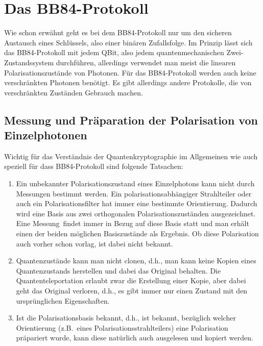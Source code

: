 \section{Das BB84-Protokoll}

Wie schon erw\"ahnt geht es bei dem BB84-Protokoll nur um den sicheren Austausch eines
Schl\"ussels, also einer bin\"aren Zufallsfolge. Im Prinzip l\"asst sich das BB84-Protokoll mit jedem
QBit, also jedem quantenmechanischen Zwei-Zustandssystem durchf\"uhren, allerdings verwendet
man meist die linearen Polarisationszust\"ande von Photonen. 
F\"ur das BB84-Protokoll werden auch keine verschr\"ankten
Photonen ben\"otigt. Es gibt allerdings andere Protokolle, die von verschr\"ankten Zust\"anden
Gebrauch machen. 

\subsection{Messung und Pr\"aparation der Polarisation von Einzelphotonen}

Wichtig f\"ur das Verst\"andnis der Quantenkryptographie im Allgemeinen wie auch speziell
f\"ur dass BB84-Protokoll sind folgende Tatsachen:
\begin{enumerate}
\item
Ein unbekannter Polarisationszustand eines Einzelphotons kann nicht durch Messungen bestimmt werden. 
Ein polarisationsabh\"angiger Strahlteiler oder auch ein Polarisationsfilter hat immer eine
bestimmte Orientierung. Dadurch wird eine Basis aus zwei orthogonalen Polarisationszust\"anden 
ausgezeichnet. Eine \glqq Messung\grqq\ findet immer in Bezug auf diese Basis statt
und man erh\"alt einen der beiden m\"oglichen Basiszust\"ande als Ergebnis. 
Ob diese Polarisation auch vorher schon vorlag, ist dabei nicht bekannt. 
\item 
Quantenzust\"ande kann man nicht clonen, d.h., man kann keine Kopien
eines Quantenzustands herstellen und dabei das Original behalten. Die Quantenteleportation erlaubt
zwar die Erstellung einer Kopie, aber dabei geht das Original verloren, d.h., es gibt immer nur einen
Zustand mit den urspr\"unglichen Eigenschaften. 
\item Ist die Polarisationsbasis bekannt, d.h., ist bekannt,
bez\"uglich welcher Orientierung (z.B.\ eines Polarisationsstrahlteilers)
eine Polarisation pr\"apariert wurde, kann diese nat\"urlich auch
ausgelesen und kopiert werden. 
\end{enumerate}

